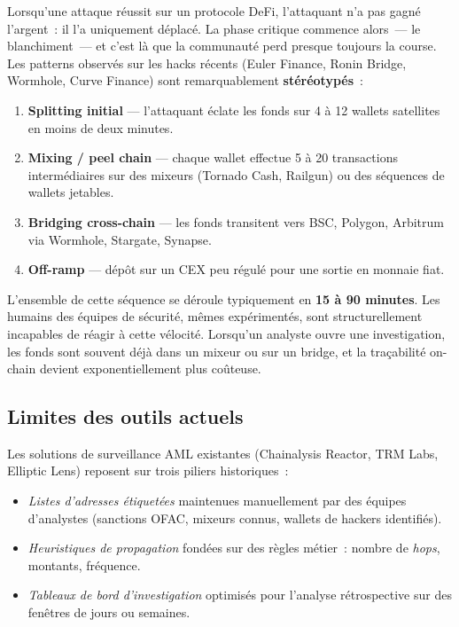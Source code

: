\documentclass[11pt,a4paper]{article}
\begin{document}
Lorsqu'une attaque réussit sur un protocole DeFi, l'attaquant n'a pas
gagné l'argent~: il l'a uniquement déplacé. La phase critique commence
alors~--- le blanchiment~--- et c'est là que la communauté perd presque
toujours la course. Les patterns observés sur les hacks récents
(Euler Finance, Ronin Bridge, Wormhole, Curve Finance) sont remarquablement
\textbf{stéréotypés}~:

\begin{enumerate}
  \item \textbf{Splitting initial} --- l'attaquant éclate les fonds sur
        4 à 12 wallets satellites en moins de deux minutes.
  \item \textbf{Mixing / peel chain} --- chaque wallet effectue 5 à 20
        transactions intermédiaires sur des mixeurs (Tornado Cash,
        Railgun) ou des séquences de wallets jetables.
  \item \textbf{Bridging cross-chain} --- les fonds transitent vers BSC,
        Polygon, Arbitrum via Wormhole, Stargate, Synapse.
  \item \textbf{Off-ramp} --- dépôt sur un CEX peu régulé pour une
        sortie en monnaie fiat.
\end{enumerate}

L'ensemble de cette séquence se déroule typiquement en
\textbf{15 à 90 minutes}. Les humains des équipes de sécurité, mêmes
expérimentés, sont structurellement incapables de réagir à cette
vélocité. Lorsqu'un analyste ouvre une investigation, les fonds sont
souvent déjà dans un mixeur ou sur un bridge, et la traçabilité on-chain
devient exponentiellement plus coûteuse.

\subsection{Limites des outils actuels}

Les solutions de surveillance AML existantes (Chainalysis Reactor,
TRM Labs, Elliptic Lens) reposent sur trois piliers historiques~:

\begin{itemize}
  \item \emph{Listes d'adresses étiquetées} maintenues manuellement par
        des équipes d'analystes (sanctions OFAC, mixeurs connus,
        wallets de hackers identifiés).
  \item \emph{Heuristiques de propagation} fondées sur des règles
        métier~: nombre de \emph{hops}, montants, fréquence.
  \item \emph{Tableaux de bord d'investigation} optimisés pour
        l'analyse rétrospective sur des fenêtres de jours ou semaines.
\end{itemize}
\end{document}

